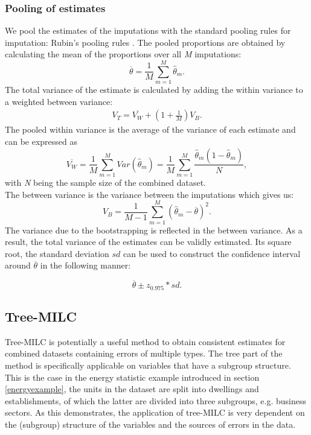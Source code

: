 \documentclass[a4paper, 11pt]{article} %
\begin{document}
\subsubsection{Pooling of estimates} \label{Poolingrules}
We pool the estimates of the imputations with the standard pooling rules for imputation: Rubin’s pooling rules \cite{Rubin1987}. 
The pooled proportions are obtained by calculating the mean of the proportions over all \textit{M} imputations:
\begin{equation}
    {\overline{\theta}}=\frac{1}{M}\sum_{m=1}^{M}{\hat{\theta}}_m.						
\end{equation}
The total variance of the estimate is calculated by adding the within variance to a weighted between variance:		
\begin{align}
    V_{T}={\overline{V_{W}}+\left(1+\frac{1}{M}\right){V}_{B}}.
\label{eq:totalvar}
\end{align} 				
The pooled within variance is the average of the variance of each estimate and can be expressed as	 
\begin{equation}\label{withinvariance}
    {\overline{V_{W}}}=   
        \frac{1}{M}\sum_{m=1}^{M} Var(\hat\theta_m)=
    \frac{1}{M}\sum_{m=1}^{M} \frac{\hat\theta_m (1-\hat\theta_m)}{N} ,
\end{equation}				
with \textit{N} being the sample size of the combined dataset.
\\The between variance is the variance between the imputations which gives us:
\begin{equation}
    {V}_{B}=\frac{1}{M-1}\sum_{m=1}^{M}
    {({{\hat\theta}}_m-{\overline{\theta}})}^2.	
\end{equation} 		
The variance due to the bootstrapping is reflected in the between variance. As a result, the total variance of the estimates can be validly estimated. Its square root, the standard deviation $sd$ can be used to construct the confidence interval around $\overline{\theta}$ in the following manner: 

\begin{equation} \label{EQconfidenceinterval}
    \overline{\theta} \pm  z_{0.975}* sd.
\end{equation}	

\subsection{Tree-MILC}
Tree-MILC is potentially a useful method to obtain consistent estimates for combined datasets containing errors of multiple types. The tree part of the method is specifically applicable on variables that have a subgroup structure. This is the case in the energy statistic example introduced in section \ref{energyexample}, the units in the dataset are split into dwellings and establishments, of which the latter are divided into three subgroups, e.g. business sectors. As this demonstrates, the application of tree-MILC is very dependent on the (subgroup) structure of the variables and the sources of errors in the data. 
\end{document}
